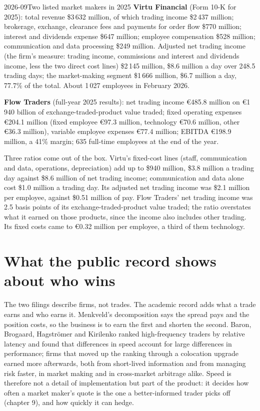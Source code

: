 \begin{dated}{2026-09}{Two listed market makers in 2025}\label{dat:hf:the-business-of-market-making:public}
\textbf{Virtu Financial} (Form 10-K for 2025): total revenue \$3\,632 million, of which trading income \$2\,437 million; brokerage, exchange,
clearance fees and payments for order flow \$770 million; interest and dividends expense \$647 million; employee compensation \$528 million;
communication and data processing \$249 million. Adjusted net trading income (the firm's measure: trading income, commissions and interest and
dividends income, less the two direct cost lines) \$2\,145 million, \$8.6 million a day over 248.5 trading days; the market-making segment
\$1\,666 million, \$6.7 million a day, 77.7\% of the total. About 1\,027 employees in February 2026.

\textbf{Flow Traders} (full-year 2025 results): net trading income \euro485.8 million on \euro1\,940 billion of exchange-traded-product value traded;
fixed operating expenses \euro204.1 million (fixed employee \euro97.3 million, technology \euro70.6 million, other \euro36.3 million), variable
employee expenses \euro77.4 million; EBITDA \euro198.9 million, a 41\% margin; 635 full-time employees at the end of the year.
\end{dated}

Three ratios come out of the box. Virtu's fixed-cost lines (staff, communication and data, operations, depreciation) add up to \$940 million, \$3.8
million a trading day against \$8.6 million of net trading income; communication and data alone cost \$1.0 million a trading day. Its adjusted net
trading income was \$2.1 million per employee, against \$0.51 million of pay. Flow Traders' net trading income was 2.5 basis points of its
exchange-traded-product value traded; the ratio overstates what it earned on those products, since the income also includes other trading. Its
fixed costs came to \euro0.32 million per employee, a third of them technology.

\section{What the public record shows about who wins}

The two filings describe firms, not trades. The academic record adds what a trade earns and who earns it. Menkveld's decomposition says the spread
pays and the position costs, so the business is to earn the first and shorten the second. Baron, Brogaard, Hagströmer and Kirilenko ranked
high-frequency traders by relative latency and found that differences in speed account for large differences in performance; firms that moved up the
ranking through a colocation upgrade earned more afterwards, both from short-lived information and from managing risk faster, in market making and
in cross-market arbitrage alike. Speed is therefore not a detail of implementation but part of the product: it decides how often a market maker's
quote is the one a better-informed trader picks off (chapter 9), and how quickly it can hedge.

